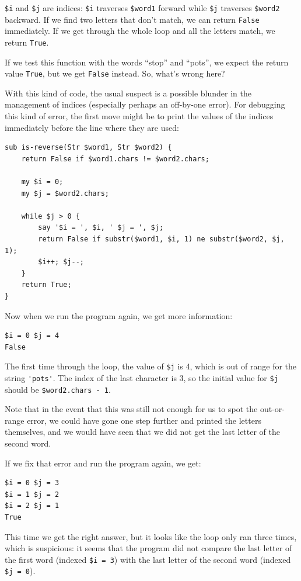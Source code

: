 {\tt \$i} and {\tt \$j} are indices: {\tt \$i} traverses 
{\tt \$word1} forward while {\tt \$j} traverses {\tt \$word2} 
backward.  If we find two letters that don't match, we 
can return {\tt False} immediately. If we get through the 
whole loop and all the letters match, we return {\tt True}.

If we test this function with the words ``stop'' and 
``pots'', we expect the return value {\tt True}, but we get 
{\tt False} instead. So, what's wrong here?

With this kind of code, the usual suspect is a possible 
blunder in the management of indices (especially perhaps 
an off-by-one error). For debugging this kind of error, 
the first move might be to print the values of the indices 
immediately before the line where they are used:

\begin{verbatim}
sub is-reverse(Str $word1, Str $word2) {
    return False if $word1.chars != $word2.chars;
    
    my $i = 0;
    my $j = $word2.chars;

    while $j > 0 {
        say '$i = ', $i, ' $j = ', $j;
        return False if substr($word1, $i, 1) ne substr($word2, $j, 1);
        $i++; $j--;
    }
    return True;
}
\end{verbatim}
%
Now when we run the program again, we get more information:

\begin{verbatim}
$i = 0 $j = 4
False
\end{verbatim}
%
The first time through the loop, the value of {\tt \$j} is 4,
which is out of range for the string \verb"'pots'".
The index of the last character is 3, so the
initial value for {\tt \$j} should be {\tt \$word2.chars - 1}.

Note that in the event that this was still not enough for us to 
spot the out-or-range error, we could have gone one step 
further and printed the letters themselves, and we would 
have seen that we did not get the last letter of the second 
word.

If we fix that error and run the program again, we get:

\begin{verbatim}
$i = 0 $j = 3
$i = 1 $j = 2
$i = 2 $j = 1
True
\end{verbatim}
%
This time we get the right answer, but it looks like the 
loop only ran three times, which is suspicious: it seems 
that the program did not compare the last letter of the 
first word (indexed {\tt \$i = 3}) with the last letter of 
the second word (indexed {\tt \$j = 0}).  

